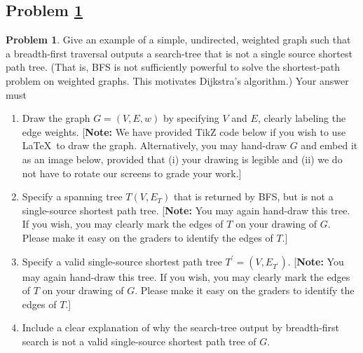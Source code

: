 \documentclass[11pt]{article}
\theoremstyle{definition}
\theoremstyle{definition}
\newtheorem{required}{Problem}
\theoremstyle{definition}
\begin{document}
\newpage
\subsection{Problem \ref{DFS4}}
\begin{required} \label{DFS4}
	Give an example of a simple, undirected, weighted graph such that a breadth-first traversal outputs a search-tree that is not a single source shortest path tree. (That is, BFS is not sufficiently powerful to solve the shortest-path problem on weighted graphs. This motivates Dijkstra's algorithm.) 
	Your answer must
	\begin{enumerate}[label=(\alph*)]
		\item Draw the graph $G = (V,E, w)$ by specifying $V$ and $E$, clearly labeling the edge weights.  [\textbf{Note:} We have provided TikZ code below if you wish to use \LaTeX \ to draw the graph. Alternatively, you may hand-draw $G$ and embed it as an image below, provided that (i) your drawing is legible and (ii) we do not have to rotate our screens to grade your work.]
		\item Specify a spanning tree $T(V, E_{T})$ that is returned by BFS, but is not a single-source shortest path tree. [\textbf{Note:} You may again hand-draw this tree. If you wish, you may clearly mark the edges of $T$ on your drawing of $G$. Please make it easy on the graders to identify the edges of $T$.] 

		\item Specify a valid single-source shortest path tree $T^{\prime} = (V,E_{T^{\prime}})$.  [\textbf{Note:} You may again hand-draw this tree. If you wish, you may clearly mark the edges of $T$ on your drawing of $G$. Please make it easy on the graders to identify the edges of $T$.] 

		\item Include a clear explanation of why the search-tree output by breadth-first search is not a valid single-source shortest path tree of $G$.
	\end{enumerate}
\end{required}
\end{document}

